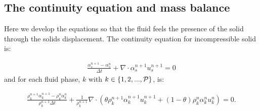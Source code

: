 \subsection{The continuity equation and mass balance}

Here we develop the equations so that the fluid feels the presence of the solid through
the solids displacement.
The continuity equation for incompressible solid is:

\begin{eqnarray}
\frac{ \alpha_s^{n+1} -\alpha_s^n}{\Delta t} + \nabla\cdot \alpha_s^{n+1} u_s^{n+1} =0
\label{solid-cty-excat}
\end{eqnarray}
and for each fluid phase, $k$ with $ k\in\{1,2,...,{\cal P}\}$, is:


\begin{eqnarray}
\frac{ \rho_k^{n+1} \alpha_k^{n+1} -\rho_k^{n}\alpha_k^n}{ \rho_k^{n+1}\Delta t}
+ \frac{1}{\rho_k^{n+1} } \nabla\cdot (\theta \rho_k^{n+1} \alpha_k^{n+1} u_k^{n+1}+(1-\theta) \rho_k^{n} \alpha_k^{n} u_k^{n}) =0.
\end{eqnarray}

